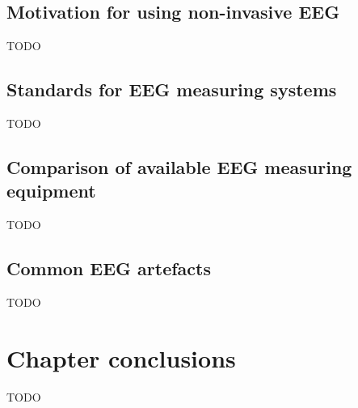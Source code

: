 \subsection{Motivation for using non-invasive EEG}
\label{subsec:biomedical_signals_measuring_why_eeg}


TODO


\subsection{Standards for EEG measuring systems}
\label{subsec:biomedical_signals_measuring_standards}

TODO


\subsection{Comparison of available EEG measuring equipment}
\label{subsec:biomedical_signals_measuring_equipment}

TODO




\subsection{Common EEG artefacts}
\label{subsec:biomedical_signals_measuring_artefacts}

TODO

\section{Chapter conclusions}
\label{sec:biomedical_signals_summary}

TODO